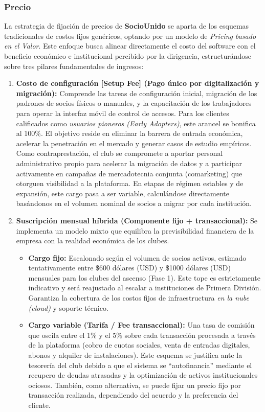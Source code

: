 \newpage

\subsubsection*{Precio}

La estrategia de fijación de precios de \textbf{SocioUnido} se aparta de los esquemas tradicionales de costos fijos genéricos, optando por un modelo de \textit{Pricing basado en el Valor}. Este enfoque busca alinear directamente el costo del software con el beneficio económico e institucional percibido por la dirigencia, estructurándose sobre tres pilares fundamentales de ingresos:

\begin{enumerate}
    \item \textbf{Costo de configuración [Setup Fee] (Pago único por digitalización y migración):} Comprende las tareas de configuración inicial, migración de los padrones de socios físicos o manuales, y la capacitación de los trabajadores para operar la interfaz móvil de control de accesos. Para los clientes calificados como \textit{usuarios pioneros (Early Adopters)}, este arancel se bonifica al 100\%. El objetivo reside en eliminar la barrera de entrada económica, acelerar la penetración en el mercado y generar casos de estudio empíricos. Como contraprestación, el club se compromete a aportar personal administrativo propio para acelerar la migración de datos y a participar activamente en campañas de mercadotecnia conjunta (comarketing) que otorguen visibilidad a la plataforma. En etapas de régimen estables y de expansión, este cargo pasa a ser variable, calculándose directamente basándonos en el volumen nominal de socios a migrar por cada institución.
    \item \textbf{Suscripción mensual híbrida (Componente fijo + transaccional):} Se implementa un modelo mixto que equilibra la previsibilidad financiera de la empresa con la realidad económica de los clubes.
    \begin{itemize}
        \item \textbf{Cargo fijo:} Escalonado según el volumen de socios activos, estimado tentativamente entre \$600 dólares (USD) y \$1000 dólares (USD) mensuales para los clubes del ascenso (Fase 1). Este tope es estrictamente indicativo y será reajustado al escalar a instituciones de Primera División. Garantiza la cobertura de los costos fijos de infraestructura \textit{en la nube (cloud)} y soporte técnico.
        \item \textbf{Cargo variable (Tarifa / Fee transaccional):} Una tasa de comisión que oscila entre el 1\% y el 5\% sobre cada transacción procesada a través de la plataforma (cobro de cuotas sociales, venta de entradas digitales, abonos y alquiler de instalaciones). Este esquema se justifica ante la tesorería del club debido a que el sistema se ``autofinancia'' mediante el recupero de deudas atrasadas y la optimización de activos institucionales ociosos. También, como alternativa, se puede fijar un precio fijo por transacción realizada, dependiendo del acuerdo y la preferencia del cliente.

\end{itemize}
\end{enumerate}
